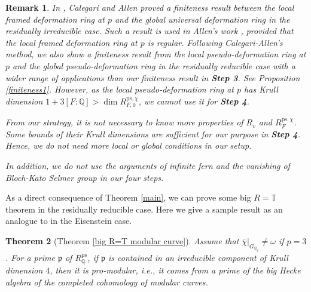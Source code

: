 \documentclass[a4paper, 12pt]{amsart}
\newtheorem{thm}{Theorem}[subsection]
\newtheorem{rem}[thm]{\bf Remark}
\def\ps{\mathrm{ps}}
\newcommand{\Q}{\mathbb{Q}}
\newcommand{\T}{\mathbb{T}}
\newcommand{\kp}{\mathfrak{p}}
\begin{document}
	\begin{rem}
		In \cite{Allen_2014}, Calegari and Allen proved a finiteness result between the local framed deformation ring at $p$ and the global universal deformation ring in the residually irreducible case. Such a result is used in Allen's work \cite{Allen_2019}, provided that the local framed deformation ring at $p$ is regular. Following Calegari-Allen's method, we also show a finiteness result from the local pseudo-deformation ring at $p$ and the global pseudo-deformation ring in the residually reducible case with a wider range of applications than our finiteness result in \textbf{Step 3}. See Proposition \ref{finiteness1}. However, as the local pseudo-deformation ring at $p$ has Krull dimension $1+3[F:\Q] > \dim R_{F, 0}^{\ps, \chi}$, we cannot use it for \textbf{Step 4}.
		
		From our strategy, it is not necessary to know more properties of $R_v$ and $R_F^{\ps, \chi}$. Some bounds of their Krull dimensions are sufficient for our purpose in  \textbf{Step 4}. Hence, we do not need more local or global conditions  in our setup.
		
		In addition, we do not use the arguments of infinite fern and the vanishing of Bloch-Kato Selmer group in our four steps. 
	\end{rem}
	
	As a direct consequence of Theorem \ref{main}, we can prove some big $R=\T$ theorem in the residually reducible case. Here we give a sample result as an analogue to \cite[Theorem 1.2.3]{emerton11} in the Eisenstein case.
	
	\begin{thm}[Theorem \ref{big R=T modular curve}]
		Assume that $\bar{\chi}|_{G_{\Q_p}} \ne \omega$ if $p=3$. For a prime $\kp$ of $R_\Q^\ps$, if $\kp$ is contained in an irreducible component of Krull dimension $4$, then it is pro-modular, i.e., it comes from a prime of the big Hecke algebra of the completed cohomology of modular curves.
	\end{thm}
	
	
\end{document}
